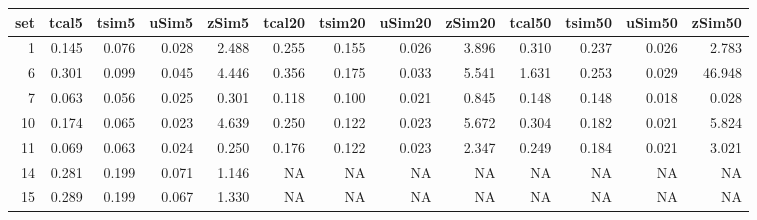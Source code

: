 
\begin{tabular}{r|r|r|r|r|r|r|r|r|r|r|r|r}
\hline
set & tcal5 & tsim5 & uSim5 & zSim5 & tcal20 & tsim20 & uSim20 & zSim20 & tcal50 & tsim50 & uSim50 & zSim50\\
\hline
1 & 0.145 & 0.076 & 0.028 & 2.488 & 0.255 & 0.155 & 0.026 & 3.896 & 0.310 & 0.237 & 0.026 & 2.783\\
\hline
6 & 0.301 & 0.099 & 0.045 & 4.446 & 0.356 & 0.175 & 0.033 & 5.541 & 1.631 & 0.253 & 0.029 & 46.948\\
\hline
7 & 0.063 & 0.056 & 0.025 & 0.301 & 0.118 & 0.100 & 0.021 & 0.845 & 0.148 & 0.148 & 0.018 & 0.028\\
\hline
10 & 0.174 & 0.065 & 0.023 & 4.639 & 0.250 & 0.122 & 0.023 & 5.672 & 0.304 & 0.182 & 0.021 & 5.824\\
\hline
11 & 0.069 & 0.063 & 0.024 & 0.250 & 0.176 & 0.122 & 0.023 & 2.347 & 0.249 & 0.184 & 0.021 & 3.021\\
\hline
14 & 0.281 & 0.199 & 0.071 & 1.146 & NA & NA & NA & NA & NA & NA & NA & NA\\
\hline
15 & 0.289 & 0.199 & 0.067 & 1.330 & NA & NA & NA & NA & NA & NA & NA & NA\\
\hline
\end{tabular}
